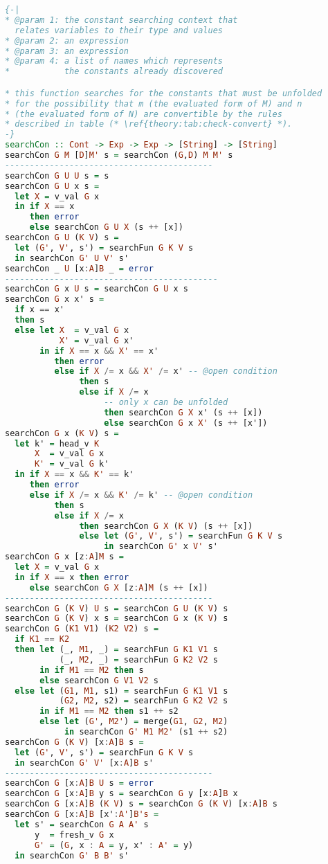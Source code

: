 \begin{lstlisting}[language=Haskell, caption={Approximation Algorithm For Minimum Set of Constants}, label={theory:alg:minimum}]
{-|
* @param 1: the constant searching context that
  relates variables to their type and values
* @param 2: an expression
* @param 3: an expression
* @param 4: a list of names which represents
*           the constants already discovered

* this function searches for the constants that must be unfolded
* for the possibility that m (the evaluated form of M) and n
* (the evaluated form of N) are convertible by the rules 
* described in table (* \ref{theory:tab:check-convert} *).
-}
searchCon :: Cont -> Exp -> Exp -> [String] -> [String]
searchCon G M [D]M' s = searchCon (G,D) M M' s
------------------------------------------
searchCon G U U s = s
searchCon G U x s =  
  let X = v_val G x
  in if X == x
     then error
     else searchCon G U X (s ++ [x]) 
searchCon G U (K V) s = 
  let (G', V', s') = searchFun G K V s
  in searchCon G' U V' s'
searchCon _ U [x:A]B _ = error
-------------------------------------------
searchCon G x U s = searchCon G U x s
searchCon G x x' s = 
  if x == x'
  then s
  else let X  = v_val G x
           X' = v_val G x' 
       in if X == x && X' == x'
          then error
          else if X /= x && X' /= x' -- @open condition
               then s
               else if X /= x
                    -- only x can be unfolded
                    then searchCon G X x' (s ++ [x])
                    else searchCon G x X' (s ++ [x'])
searchCon G x (K V) s = 
  let k' = head_v K
      X  = v_val G x
      K' = v_val G k'
  in if X == x && K' == k'
     then error
     else if X /= x && K' /= k' -- @open condition
          then s
          else if X /= x 
               then searchCon G X (K V) (s ++ [x])
               else let (G', V', s') = searchFun G K V s
                    in searchCon G' x V' s'
searchCon G x [z:A]M s =
  let X = v_val G x
  in if X == x then error
     else searchCon G X [z:A]M (s ++ [x])
------------------------------------------
searchCon G (K V) U s = searchCon G U (K V) s
searchCon G (K V) x s = searchCon G x (K V) s
searchCon G (K1 V1) (K2 V2) s =
  if K1 == K2
  then let (_, M1, _) = searchFun G K1 V1 s
           (_, M2, _) = searchFun G K2 V2 s
       in if M1 == M2 then s
       else searchCon G V1 V2 s
  else let (G1, M1, s1) = searchFun G K1 V1 s
           (G2, M2, s2) = searchFun G K2 V2 s 
       in if M1 == M2 then s1 ++ s2
       else let (G', M2') = merge(G1, G2, M2)
            in searchCon G' M1 M2' (s1 ++ s2)
searchCon G (K V) [x:A]B s =
  let (G', V', s') = searchFun G K V s
  in searchCon G' V' [x:A]B s'
------------------------------------------
searchCon G [x:A]B U s = error
searchCon G [x:A]B y s = searchCon G y [x:A]B x
searchCon G [x:A]B (K V) s = searchCon G (K V) [x:A]B s
searchCon G [x:A]B [x':A']B's =
  let s' = searchCon G A A' s
      y  = fresh_v G x
      G' = (G, x : A = y, x' : A' = y)
  in searchCon G' B B' s'


\end{lstlisting}
